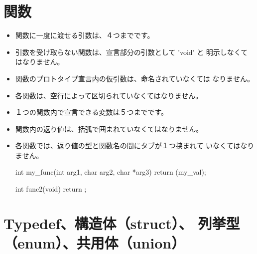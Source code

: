 \documentclass{42-ja}
\begin{document}
    \section{関数}

        \begin{itemize}

            \item 関数に一度に渡せる引数は、４つまでです。

            \item 引数を受け取らない関数は、宣言部分の引数として 'void' と
				明示しなくてはなりません。

            \item 関数のプロトタイプ宣言内の仮引数は、命名されていなくては
				なりません。

            \item 各関数は、空行によって区切られていなくてはなりません。

            \item １つの関数内で宣言できる変数は５つまでです。

            \item 関数内の返り値は、括弧で囲まれていなくてはなりません。

            \item 各関数では、返り値の型と関数名の間にタブが１つ挟まれて
				いなくてはなりません。

            \begin{42ccode}
int my_func(int arg1, char arg2, char *arg3)
{
    return (my_val);
}

int func2(void)
{
    return ;
}
            \end{42ccode}

        \end{itemize}
        \newpage


    \section{Typedef、構造体（struct）、 列挙型（enum）、共用体（union）}
\end{document}
